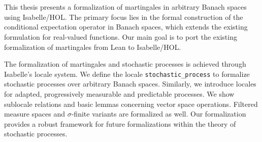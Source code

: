 ﻿\chapter{\abstractname}
This thesis presents a formalization of martingales in arbitrary Banach spaces using Isabelle/HOL. The primary focus lies in the formal construction of the conditional expectation operator in Banach spaces, which extends the existing formulation for real-valued functions. 
Our main goal is to port the existing formalization of martingales from Lean to Isabelle/HOL.

The formalization of martingales and stochastic processes is achieved through Isabelle's locale system. We define the locale \lstinline{stochastic_process} to formalize stochastic processes over arbitrary Banach spaces. Similarly, we introduce locales for adapted, progressively measurable and predictable processes. We show sublocale relations and basic lemmas concerning vector space operations. Filtered measure spaces and $\sigma$-finite variants are formalized as well. Our formalization provides a robust framework for future formalizations within the theory of stochastic processes.